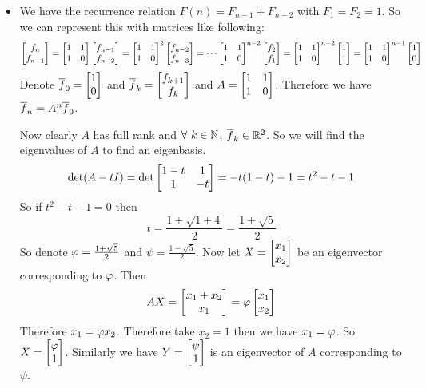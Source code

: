 \documentclass[a4paper, 11pt]{article}
\begin{document}
{\begin{itemize}[label=$\bullet$]
                       Now suppose the opposite. There exists $q_1,\dots, q_m$ such that $a_n=\sum\limits_{j=1}^m q_j(n)\lm^n$ for all $n\geq 0$. Each $q_j$ can be expressed as $q_j(n)=\sum_{t_j=0}^{d_j}p_{j,t_j}n^{t_j}$. Now from the above discussion it is visible that $q_j$ is uniquely determined by the first $a_0,\dots, a_{t-1}$ values. So the coefficients $p_{j,t_j}$ for all $j,t_j$ is uniquely determined by $a_0,\dots, a_{t-1}$ and through a linear transformation from $(a_0,\dots, a_{t-1})\mapsto (p_{j,t_j})_{j\in[m], 0\leq t_j\leq d_j}$. Since $\sum_{j=1}^t d_j=t$ we have an injective linear map from $\bbC^t$ to $\bbC^t$. Hence it is surjective. Therefore if we have an isomorphism and we can take the inverse map and from $ (p_{j,t_j})_{j\in[m], 0\leq t_j\leq d_j}$ we can get back $(a_0,\dots, a_{i-t})$. And then produce the whole sequence by the recurrence relation but using the formula that  $a_n=\sum\limits_{j=1}^m q_j(n)\lm^n$ for all $n\geq 0$.
\item \parinn 	We have the recurrence relation $F(n)=F_{n-1}+F_{n-2}$ with $F_1=F_2=1$. So we can represent this with matrices like following:
$$\left[\begin{matrix}f_{n}\\ f_{n-1}\end{matrix}\right]=\left[\begin{matrix}1 & 1\\ 1& 0\end{matrix}\right]\left[\begin{matrix}f_{n-1}\\ f_{n-2}\end{matrix}\right]=\left[\begin{matrix}1 & 1\\ 1& 0\end{matrix}\right]^2\left[\begin{matrix}f_{n-2}\\ f_{n-3}\end{matrix}\right]=\cdots \left[\begin{matrix}1 & 1\\ 1& 0\end{matrix}\right]^{n-2}\left[\begin{matrix}f_2\\ f_1\end{matrix}\right]=\left[\begin{matrix}1 & 1\\ 1& 0\end{matrix}\right]^{n-2}\left[\begin{matrix}1\\ 1\end{matrix}\right]=\left[\begin{matrix}1 & 1\\ 1& 0\end{matrix}\right]^{n-1}\left[\begin{matrix}1\\ 0\end{matrix}\right]$$Denote $\overline{f}_0=\left[\begin{matrix}1\\ 0\end{matrix}\right]$ and $\overline{f}_{k}=\left[\begin{matrix}f_{k+1}\\ f_k\end{matrix}\right]$ and $A=\left[\begin{matrix}1 & 1\\ 1& 0\end{matrix}\right]$. Therefore we have $\overline{f}_n=A^n\overline{f}_0$. 

Now clearly $A$ has full rank and $\forall\ k\in \mathbb{N}$, $\overline{f}_k\in\mathbb{R}^2$. So we will find the eigenvalues of $A$ to find an eigenbasis. $$\det(A-tI)=\det \left[\begin{matrix}1-t&1\\ 1& -t\end{matrix}\right]=-t(1-t)-1=t^2-t-1$$So if $t^2-t-1=0$ then $$t=\frac{1\pm\sqrt{{1+4}}}{2}=\frac{1\pm\sqrt{5}}2$$So denote $\varphi=\frac{1+\sqrt{5}}2$ and $\psi=\frac{1-\sqrt{5}}2$. Now let $X=\left[\begin{matrix}x_1\\ x_2\end{matrix}\right]$ be an eigenvector corresponding to $\varphi$. Then $$AX=\left[\begin{matrix}x_1+x_2\\ x_1\end{matrix}\right]=\varphi\left[\begin{matrix}x_1\\ x_2\end{matrix}\right]$$Therefore $x_1=\varphi x_2$. Therefore take $x_2=1$ then we have $x_1=\varphi$. So $X=\left[\begin{matrix}\varphi\\ 1\end{matrix}\right]$. Similarly we have  $Y=\left[\begin{matrix}\psi\\ 1\end{matrix}\right]$ is an eigenvector of $A$ corresponding to $\psi$.


\end{itemize}}
\end{document}
